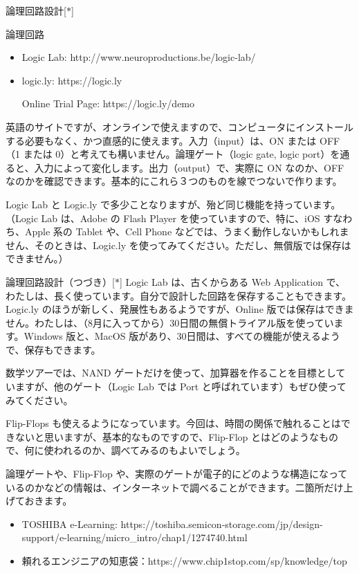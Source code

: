 \documentclass[10pt, dvipdfmx]{beamer}
\begin{document}
\begin{frame}{論理回路設計\hfill [$\ast$]}

\begin{exampleblock}{論理回路}
\begin{itemize}
\item Logic Lab: http://www.neuroproductions.be/logic-lab/
\item logic.ly: https://logic.ly\par
Online Trial Page: https://logic.ly/demo
\end{itemize}
\end{exampleblock}

 英語のサイトですが、オンラインで使えますので、コンピュータにインストールする必要もなく、かつ直感的に使えます。入力（input）は、ON または OFF （1 または 0）と考えても構いません。論理ゲート（logic gate, logic port）を通ると、入力によって変化します。出力（output）で、実際に ON なのか、OFF なのかを確認できます。基本的にこれら３つのものを線でつないで作ります。

 Logic Lab と Logic.ly で多少ことなりますが、殆ど同じ機能を持っています。（Logic Lab は、Adobe の Flash Player を使っていますので、特に、iOS すなわち、Apple 系の Tablet や、Cell Phone などでは、うまく動作しないかもしれません、そのときは、Logic.ly を使ってみてください。ただし、無償版では保存はできません。）
\end{frame}
\begin{frame}{論理回路設計（つづき）\hfill [$\ast$]}
Logic Lab は、古くからある Web Application で、わたしは、長く使っています。自分で設計した回路を保存することもできます。Logic.ly のほうが新しく、発展性もあるようですが、Online 版では保存はできません。わたしは、（8月に入ってから）30日間の無償トライアル版を使っています。Windows 版と、MacOS 版があり、30日間は、すべての機能が使えるようで、保存もできます。

数学ツアーでは、NAND ゲートだけを使って、加算器を作ることを目標としていますが、他のゲート（Logic Lab では Port と呼ばれています）もぜひ使ってみてください。

Flip-Flops も使えるようになっています。今回は、時間の関係で触れることはできないと思いますが、基本的なものですので、Flip-Flop とはどのようなもので、何に使われるのか、調べてみるのもよいでしょう。

論理ゲートや、Flip-Flop や、実際のゲートが電子的にどのような構造になっているのかなどの情報は、インターネットで調べることができます。二箇所だけ上げておきます。

\begin{itemize}
\item TOSHIBA e-Learning: https://toshiba.semicon-storage.com/jp/design-support/e-learning/micro\_intro/chap1/1274740.html
\item 頼れるエンジニアの知恵袋：https://www.chip1stop.com/sp/knowledge/top
\end{itemize}
\end{frame}
\end{document}
